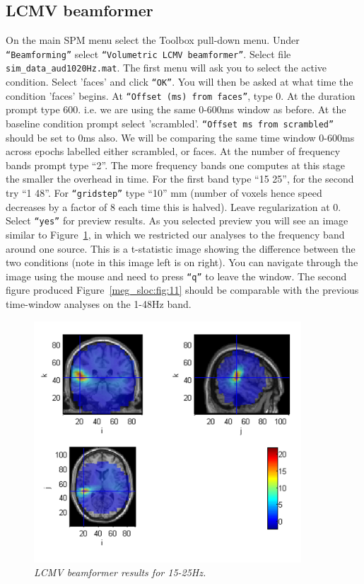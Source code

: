\subsection{LCMV beamformer}
On the main SPM menu select the Toolbox pull-down menu. Under \texttt{``Beamforming''} select \texttt{``Volumetric LCMV beamformer''}.
Select file \texttt{sim\_data\_aud1020Hz.mat}.
The first menu will ask you to select the active condition. Select 'faces' and click \texttt{``OK''}. You will then be asked at what time the condition 'faces' begins.  At \texttt{``Offset (ms) from faces''}, type 0. At the duration prompt type 600. i.e. we are using the same 0-600ms window as before. At the baseline condition prompt select 'scrambled'. \texttt{``Offset ms from scrambled''} should be set to 0ms also. We will be comparing the same time window 0-600ms across epochs labelled either scrambled, or faces. At the number of frequency bands prompt type ``2''. The more frequency bands one computes at this stage the smaller the overhead in time. For the first band type ``15 25'', for the second try ``1 48''. For \texttt{``gridstep''} type ``10'' mm (number of voxels hence speed decreases by a factor of 8 each time this is halved). Leave regularization at 0. Select \texttt{``yes''} for preview results.
As you selected preview you will see an image similar to Figure~\ref{meg_sloc:fig:10}, in which we restricted our analyses to the frequency band around one source. This is a t-statistic image showing the difference between the two conditions (note in this image left is on right). You can navigate through the image using the mouse and need to press  \texttt{``q''} to leave the window. The second figure produced Figure~\ref{meg_sloc:fig:11} should be comparable with the previous time-window analyses on the 1-48Hz band. 

\begin{figure}
\begin{center}
\includegraphics[width=100mm]{meg_sloc/slide10}
\caption{\em LCMV beamformer results for 15-25Hz.\label{meg_sloc:fig:10}}
\end{center}
\end{figure}

